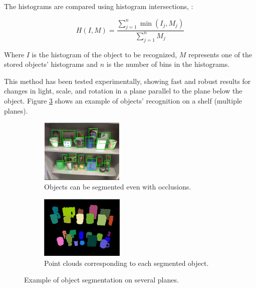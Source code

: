 \documentclass{llncs}
\begin{document}





 The histograms are compared using histogram intersections, \cite{swain1991_HistoInter}:

\begin{equation}
H(I,M) = \frac{ \sum_{j=1}^{n} \min(I_j, M_j) }{ \sum_{j=1}^{n} M_j }
\end{equation}

Where \(I\) is the histogram of the object to be recognized, \(M\) represents one of the stored objects' histograms and \(n\) is the
number of bins in the histograms. 

This method has been tested experimentally, showing fast and robust results for changes in light, scale, and rotation in a plane
parallel to the plane below the object. 
Figure \ref{fig:objReco} shows an example of objects' recognition on a shelf (multiple planes).

\begin{figure}
	\centering
	\begin{subfigure}{0.49\textwidth}
		\includegraphics[angle=0, height=3cm, width=4cm]{Figures/objetos1.eps}
		\caption{Objects can be segmented even with occlusions.}
		\label{fig:objReco2}
	\end{subfigure}
	\begin{subfigure}{0.49\textwidth}
		\includegraphics[angle=0, height=3cm, width=4cm]{Figures/objetos2.eps} 
		\caption{ Point clouds corresponding to each segmented object.}
		\label{fig:objReco1}
	\end{subfigure}
	\caption{Example of object segmentation on several planes.}
	\label{fig:objReco}
\end{figure}
\end{document}
